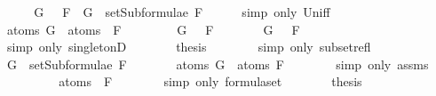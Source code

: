 \begin{isabellebody}
\ \ \isamarkupfalse%
\ \isamarkupfalse%
\ {\isachardoublequoteopen}G\ {\isasymin}\ {\isacharbraceleft}\isactrlbold {\isasymnot}\ F{\isacharbraceright}\ {\isasymor}\ G\ {\isasymin}\ setSubformulae\ F{\isachardoublequoteclose}\isanewline
\ \ \ \ \isamarkupfalse%
\ {\isacharparenleft}simp\ only{\isacharcolon}\ Un{\isacharunderscore}iff{\isacharparenright}\isanewline
\ \ \isamarkupfalse%
\ \isamarkupfalse%
\ {\isachardoublequoteopen}atoms\ G\ {\isasymsubseteq}\ atoms\ {\isacharparenleft}\isactrlbold {\isasymnot}\ F{\isacharparenright}{\isachardoublequoteclose}\isanewline
\ \ \isamarkupfalse%
\isanewline
\ \ \ \ \isamarkupfalse%
\ {\isachardoublequoteopen}G\ {\isasymin}\ {\isacharbraceleft}\isactrlbold {\isasymnot}\ F{\isacharbraceright}{\isachardoublequoteclose}\isanewline
\ \ \ \ \isamarkupfalse%
\ \isamarkupfalse%
\ {\isachardoublequoteopen}G\ {\isacharequal}\ \isactrlbold {\isasymnot}\ F{\isachardoublequoteclose}\isanewline
\ \ \ \ \ \ \isamarkupfalse%
\ {\isacharparenleft}simp\ only{\isacharcolon}\ singletonD{\isacharparenright}\isanewline
\ \ \ \ \isamarkupfalse%
\ \isamarkupfalse%
\ {\isacharquery}thesis\isanewline
\ \ \ \ \ \ \isamarkupfalse%
\ {\isacharparenleft}simp\ only{\isacharcolon}\ subset{\isacharunderscore}refl{\isacharparenright}\isanewline
\ \ \isamarkupfalse%
\isanewline
\ \ \ \ \isamarkupfalse%
\ {\isachardoublequoteopen}G\ {\isasymin}\ setSubformulae\ F{\isachardoublequoteclose}\isanewline
\ \ \ \ \isamarkupfalse%
\ \isamarkupfalse%
\ {\isachardoublequoteopen}atoms\ G\ {\isasymsubseteq}\ atoms\ F{\isachardoublequoteclose}\isanewline
\ \ \ \ \ \ \isamarkupfalse%
\ {\isacharparenleft}simp\ only{\isacharcolon}\ assms{\isacharparenleft}{}{\isacharparenright}{\isacharparenright}\isanewline
\ \ \ \ \isamarkupfalse%
\ \isamarkupfalse%
\ {\isachardoublequoteopen}{\isasymdots}\ {\isacharequal}\ atoms\ {\isacharparenleft}\isactrlbold {\isasymnot}\ F{\isacharparenright}{\isachardoublequoteclose}\isanewline
\ \ \ \ \ \ \isamarkupfalse%
\ {\isacharparenleft}simp\ only{\isacharcolon}\ formula{\isachardot}set{\isacharparenleft}{}{\isacharparenright}{\isacharparenright}\isanewline
\ \ \ \ \isamarkupfalse%
\ \isamarkupfalse%
\ {\isacharquery}thesis\isanewline

\end{isabellebody}
